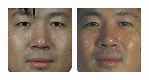\begin{figure}
\begin{center}
{\includegraphics[width=\columnwidth/12]{ch5/figures/00029_940519_fb.png}
\includegraphics[width=\columnwidth/12]{ch5/figures/00029_940928_fb.png}
}
\end{center}
\end{figure}
